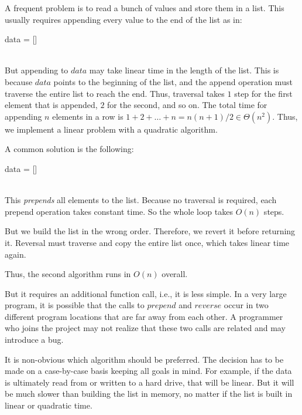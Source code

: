 \begin{example}
A frequent problem is to read a bunch of values and store them in a list.
This usually requires appending every value to the end of the list as in:

\begin{acode}
data = []\\
\\
\end{acode}

But appending to $data$ may take linear time in the length of the list.
This is because $data$ points to the beginning of the list, and the append operation must traverse the entire list to reach the end.
Thus, traversal takes $1$ step for the first element that is appended, $2$ for the second, and so on.
The total time for appending $n$ elements in a row is $1+2+\ldots+n=n(n+1)/2\in \Theta(n^2)$.
Thus, we implement a linear problem with a quadratic algorithm.
\medskip

A common solution is the following:

\begin{acode}
data = []\\
\\
\end{acode}

This \emph{prepends} all elements to the list.
Because no traversal is required, each prepend operation takes constant time.
So the whole loop takes $O(n)$ steps.

But we build the list in the wrong order.
Therefore, we revert it before returning it.
Reversal must traverse and copy the entire list once, which takes linear time again.

Thus, the second algorithm runs in $O(n)$ overall.

But it requires an additional function call, i.e., it is less simple.
In a very large program, it is possible that the calls to $prepend$ and $reverse$ occur in two different program locations that are far away from each other.
A programmer who joins the project may not realize that these two calls are related and may introduce a bug.
\medskip

It is non-obvious which algorithm should be preferred.
The decision has to be made on a case-by-case basis keeping all goals in mind.
For example, if the data is ultimately read from or written to a hard drive, that will be linear.
But it will be much slower than building the list in memory, no matter if the list is built in linear or quadratic time.
\end{example}

